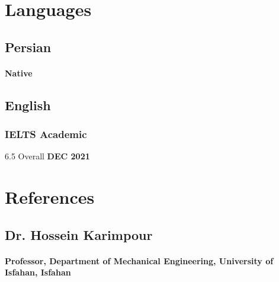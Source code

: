 \documentclass[a4paper]{article}
\begin{document}
\section{Languages}
    
\begin{multicols}{2}
	\subsection{Persian}
	\paragraph{\bfseries Native}
	\vfill\null
	\columnbreak
	\subsection{English}
	\subsubsection{IELTS Academic}
	{6.5 Overall}
	\hfill
	{\bfseries DEC 2021}
\end{multicols}

\section{References}
\subsection{Dr. Hossein Karimpour}
\paragraph{\bfseries Professor, Department of Mechanical Engineering, University of Isfahan, Isfahan}
\end{document}
